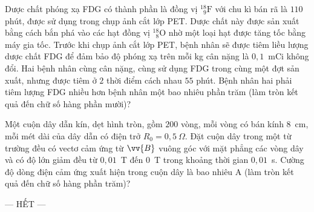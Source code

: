 	\begin{ex}%
		Dược chất phóng xạ FDG có thành phần là đồng vị ${}^{18}_{\phantom{1}9}\text{F}$ với chu kì bán rã là $110$ phút, được sử dụng trong chụp ảnh cắt lớp PET. Dược chất này được sản xuất bằng cách bắn phá vào các hạt đồng vị ${}^{18}_{\phantom{1}8}\text{O}$ nhờ một loại hạt được tăng tốc bằng máy gia tốc. Trước khi chụp ảnh cắt lớp PET, bệnh nhân sẽ được tiêm liều lượng dược chất FDG để đảm bảo độ phóng xạ trên mỗi kg cân nặng là $0{,}1$~mCi không đổi. Hai bệnh nhân cùng cân nặng, cùng sử dụng FDG trong cùng một đợt sản xuất, nhưng được tiêm ở $2$ thời điểm cách nhau $55$ phút. Bệnh nhân hai phải tiêm lượng FDG nhiều hơn bệnh nhân một bao nhiêu phần trăm (làm tròn kết quả đến chữ số hàng phần mười)?
		\par
	\end{ex}

	\begin{ex}%
		Một cuộn dây dẫn kín, dẹt hình tròn, gồm $200$ vòng, mỗi vòng có bán kính $8$~cm, mỗi mét dài của dây dẫn có điện trở $R_0=0{,}5~\Omega$. Đặt cuộn dây trong một từ trường đều có vectơ cảm ứng từ $\vv{B}$ vuông góc với mặt phẳng các vòng dây và có độ lớn giảm đều từ $0{,}01$~T đến $0$~T trong khoảng thời gian $0{,}01$~s. Cường độ dòng điện cảm ứng xuất hiện trong cuộn dây là bao nhiêu A (làm tròn kết quả đến chữ số hàng phần trăm)?
		\par
	\end{ex}

	\centerline{--- HẾT ---}


